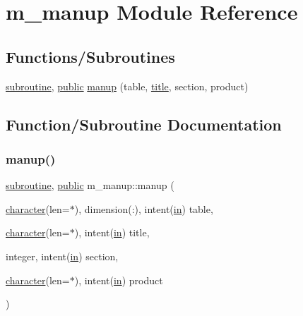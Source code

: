 \hypertarget{namespacem__manup}{}\section{m\+\_\+manup Module Reference}
\label{namespacem__manup}
\subsection*{Functions/\+Subroutines}
\begin{DoxyCompactItemize}
\item 
\hyperlink{M__stopwatch_83_8txt_acfbcff50169d691ff02d4a123ed70482}{subroutine}, \hyperlink{M__stopwatch_83_8txt_a2f74811300c361e53b430611a7d1769f}{public} \hyperlink{namespacem__manup_a2d0a043fa0f6b2ca01e2eb4747ef4bbd}{manup} (table, \hyperlink{print__watch_83_8txt_a15b5bd21156bb9fca6a755ab8c029a9c}{title}, section, product)
\end{DoxyCompactItemize}


\subsection{Function/\+Subroutine Documentation}
\mbox{\label{namespacem__manup_a2d0a043fa0f6b2ca01e2eb4747ef4bbd}} 
\subsubsection{\texorpdfstring{manup()}{manup()}}
{\footnotesize\ttfamily \hyperlink{M__stopwatch_83_8txt_acfbcff50169d691ff02d4a123ed70482}{subroutine}, \hyperlink{M__stopwatch_83_8txt_a2f74811300c361e53b430611a7d1769f}{public} m\+\_\+manup\+::manup (\begin{DoxyParamCaption}\item[{\hyperlink{option__stopwatch_83_8txt_abd4b21fbbd175834027b5224bfe97e66}{character}(len=$\ast$), dimension(\+:), intent(\hyperlink{M__journal_83_8txt_afce72651d1eed785a2132bee863b2f38}{in})}]{table,  }\item[{\hyperlink{option__stopwatch_83_8txt_abd4b21fbbd175834027b5224bfe97e66}{character}(len=$\ast$), intent(\hyperlink{M__journal_83_8txt_afce72651d1eed785a2132bee863b2f38}{in})}]{title,  }\item[{integer, intent(\hyperlink{M__journal_83_8txt_afce72651d1eed785a2132bee863b2f38}{in})}]{section,  }\item[{\hyperlink{option__stopwatch_83_8txt_abd4b21fbbd175834027b5224bfe97e66}{character}(len=$\ast$), intent(\hyperlink{M__journal_83_8txt_afce72651d1eed785a2132bee863b2f38}{in})}]{product }\end{DoxyParamCaption})}



